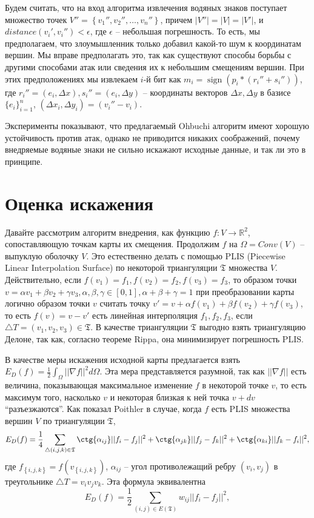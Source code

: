 \documentclass{article}
\newcommand{\sgn}{\operatorname{sign}}
\begin{document}
Будем считать, что на вход алгоритма извлечения водяных знаков поступает множество точек $V'' = \left\{v_1'', v_2'', \dots , v_n''\right\}$, причем $|V''| = |V| = |V'|$, и 
$distance(v_i', v_i'') < \epsilon$, где $\epsilon$ -- небольшая погрешность. То есть, мы предполагаем, что злоумышленник только добавил какой-то шум к координатам вершин. Мы вправе предполагать это, так как существуют способы борьбы с другими способами атак или сведения их к небольшим смещениям вершин. При этих предположениях мы извлекаем $i$-й бит как
$m_i = \sgn( p_i * ( r_i'' + s_i'') )$, где $r_i'' = (e_i, \Delta x), s_i'' = (e_i, \Delta y)$ -- координаты векторов $\Delta x, \Delta y$ в базисе $\{e_i\}_{i=1}^n$, 
$(\Delta x_i, \Delta y_i) = (v_i'' - v_i)$. 

Эксперименты показывают, что предлагаемый Ohbuchi алгоритм имеют хорошую устойчивость против атак, однако не приводится никаких соображений, почему внедряемые водяные знаки не сильно искажают исходные данные, и так ли это в принципе. 

\section{Оценка искажения}
Давайте рассмотрим алгоритм внедрения, как функцию $f: V \to \mathbb{R}^2$, сопоставляющую точкам карты их смещения. Продолжим $f$ на $\Omega = Conv(V)$ -- выпуклую оболочку $V$. Это естественно делать с помощью PLIS (Piecewise Linear Interpolation Surface) 
по некоторой триангуляции $\mathfrak{T}$ множества $V$. Действительно, если $f(v_1) = f_1, f(v_2) = f_2, f(v_3) = f_3$, то образом точки $v = \alpha v_1 + \beta v_2 + \gamma v_3, 
\alpha, \beta, \gamma \in [0, 1], \alpha + \beta + \gamma = 1$ при преобразовании карты логично образом точки $v$ считать точку $v' = v + \alpha f(v_1) + \beta f(v_2) + \gamma f(v_3)$, то есть $f(v) = v - v'$ есть линейная интерполяция $f_1, f_2, f_3$, если $\triangle T = (v_1, v_2, v_3) \in \mathfrak{T}$.
В качестве триангуляции $\mathfrak{T}$ выгодно взять триангуляцию Делоне, так как, согласно теореме Rippa, она минимизирует погрешность PLIS.

В качестве меры искажения исходной карты предлагается взять $E_D(f) = \frac{1}{2} \int_{\Omega}{||\nabla f||^2}d\Omega$. Эта мера представляется разумной, так как $||\nabla f||$ есть величина, показывающая максимальное изменение $f$ в некоторой точке $v$, то есть максимум того, насколько 
$v$ и некоторая близкая к ней точка $v + dv$ ``разъезжаются''.
Как показал Poithler в случае, когда $f$ есть PLIS множества вершин $V$ по триангуляции $\mathfrak{T}$, 
\begin{equation*}
  E_D(f) = \frac{1}{4} \sum_{\triangle (i, j, k) \in \mathfrak{T}}
  {\ctg{\alpha_{ij}}||f_i - f_j||^2 + \ctg{\alpha_{jk}}||f_j - f_k||^2 + \ctg{\alpha_{ki}}||f_k - f_i||^2},
\end{equation*}
где $f_{\left\{i, j, k\right\}} = f(v_{\left\{i, j, k\right\}})$, $\alpha_{ij}$ -- угол противолежащий ребру $(v_i, v_j)$ в треугольнике $\triangle T = v_i v_j v_k$.
Эта формула эквивалентна
\begin{equation*}
  E_D(f) = \frac{1}{2} \sum_{\left( i, j \right) \in E\left(\mathfrak{T}\right)}{w_{ij} ||f_i - f_j||^2}, 
\end{equation*}
\end{document}
